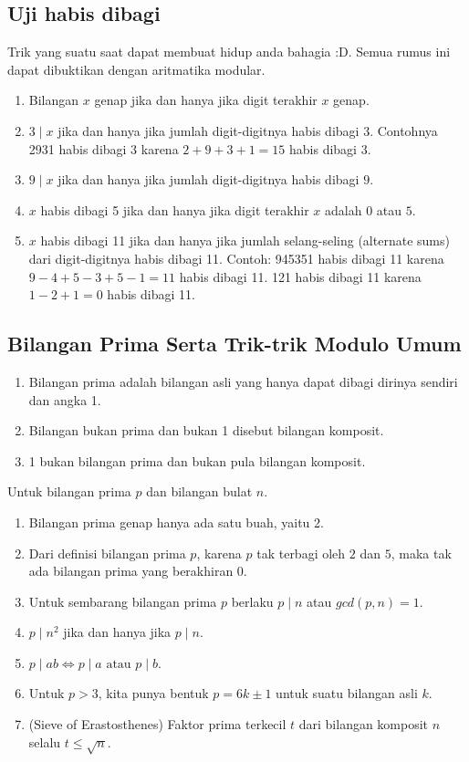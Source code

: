 \subsection{Uji habis dibagi}
    Trik yang suatu saat dapat membuat hidup anda bahagia :D. Semua rumus ini dapat dibuktikan dengan aritmatika modular.
    \begin{enumerate}
        \item Bilangan $x$ genap jika dan hanya jika digit terakhir $x$ genap.
        \item $3 \mid x$ jika dan hanya jika jumlah digit-digitnya habis dibagi $3$. Contohnya 2931 habis dibagi 3 karena $2+9+3+1=15$ habis dibagi 3.
        \item $9 \mid x$ jika dan hanya jika jumlah digit-digitnya habis dibagi $9$.
        \item $x$ habis dibagi 5 jika dan hanya jika digit terakhir $x$ adalah $0$ atau $5$.
        \item $x$ habis dibagi 11 jika dan hanya jika jumlah selang-seling (alternate sums) dari digit-digitnya habis dibagi 11. Contoh: 945351 habis dibagi 11 karena $9-4+5-3+5-1=11$ habis dibagi 11. 121 habis dibagi 11 karena $1-2+1=0$ habis dibagi 11.
    \end{enumerate}


    

\subsection{Bilangan Prima Serta Trik-trik Modulo Umum}
\begin{enumerate}
    \item Bilangan prima adalah bilangan asli yang hanya dapat dibagi dirinya sendiri dan angka 1. 
    \item Bilangan bukan prima dan bukan 1 disebut bilangan komposit.
    \item 1 bukan bilangan prima dan bukan pula bilangan komposit. 
\end{enumerate}

Untuk bilangan prima $p$ dan bilangan bulat $n$.
\begin{enumerate}
    \item Bilangan prima genap hanya ada satu buah, yaitu 2.
    \item Dari definisi bilangan prima $p$, karena $p$ tak terbagi oleh $2$ dan $5$, maka tak ada bilangan prima yang berakhiran $0$.
    \item Untuk sembarang bilangan prima $p$ berlaku $p \mid n$ atau $gcd(p,n)=1$.
    \item $p \mid n^2$ jika dan hanya jika $p \mid n$.
    \item $p \mid ab \iff p \mid a \text{ atau } p \mid b$.
    \item Untuk $p > 3$, kita punya bentuk $p = 6k \pm 1$ untuk suatu bilangan asli $k$.
    \item (Sieve of Erastosthenes) 
    Faktor prima terkecil $t$ dari bilangan komposit $n$ selalu $t \le \sqrt{n}$.
\end{enumerate}
    
